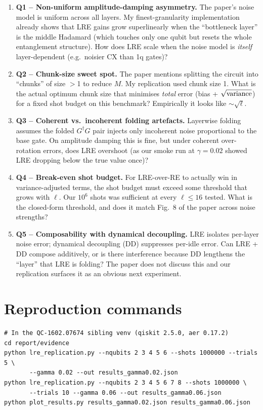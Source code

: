 \documentclass[11pt]{article}
\begin{document}
\begin{enumerate}
  \item \textbf{Q1 -- Non-uniform amplitude-damping asymmetry.} The paper's noise
    model is uniform across all layers. My finest-granularity implementation
    already shows that LRE gains grow superlinearly when the ``bottleneck layer''
    is the middle Hadamard (which touches only one qubit but resets the whole
    entanglement structure). How does LRE scale when the noise model is
    \emph{itself} layer-dependent (e.g.\ noisier CX than 1q gates)?
  \item \textbf{Q2 -- Chunk-size sweet spot.} The paper mentions splitting the
    circuit into ``chunks'' of size $>$1 to reduce $M$. My replication used
    chunk size 1. What is the actual optimum chunk size that minimises
    \emph{total} error (bias + $\sqrt{\rm variance}$) for a fixed shot
    budget on this benchmark? Empirically it looks like $\sim\!\sqrt\ell$.
  \item \textbf{Q3 -- Coherent vs.\ incoherent folding artefacts.} Layerwise
    folding assumes the folded $G^\dagger G$ pair injects only incoherent
    noise proportional to the base gate. On amplitude damping this is fine,
    but under coherent over-rotation errors, does LRE overshoot (as our
    smoke run at $\gamma=0.02$ showed LRE dropping below the true value once)?
  \item \textbf{Q4 -- Break-even shot budget.} For LRE-over-RE to actually win in
    variance-adjusted terms, the shot budget must exceed some threshold that
    grows with $\ell$. Our $10^6$ shots was sufficient at every $\ell\le 16$
    tested. What is the closed-form threshold, and does it match Fig.\ 8 of
    the paper across noise strengths?
  \item \textbf{Q5 -- Composability with dynamical decoupling.} LRE isolates
    per-layer noise error; dynamical decoupling (DD) suppresses per-idle
    error. Can LRE + DD compose additively, or is there interference because
    DD lengthens the ``layer'' that LRE is folding? The paper does not
    discuss this and our replication surfaces it as an obvious next experiment.
\end{enumerate}

\section{Reproduction commands}

\begin{lstlisting}
# In the QC-1602.07674 sibling venv (qiskit 2.5.0, aer 0.17.2)
cd report/evidence
python lre_replication.py --nqubits 2 3 4 5 6 --shots 1000000 --trials 5 \
       --gamma 0.02 --out results_gamma0.02.json
python lre_replication.py --nqubits 2 3 4 5 6 7 8 --shots 1000000 \
       --trials 10 --gamma 0.06 --out results_gamma0.06.json
python plot_results.py results_gamma0.02.json results_gamma0.06.json
\end{lstlisting}
\end{document}
